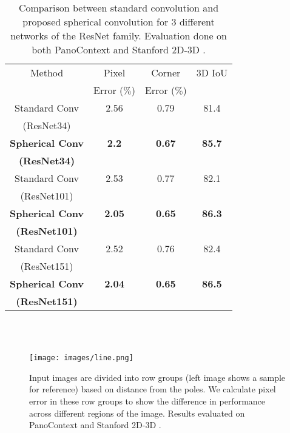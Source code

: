 \documentclass[final]{cvpr}
\begin{document}
\begin{table}[htb!]
\centering
 \begin{tabular}{||c c c c||} 
 \hline
 Method & Pixel & Corner & 3D IoU \\[0.5ex] 
 &Error ($\%$)&Error ($\%$)&\\[0.5ex]
 \hline\hline
 Standard Conv & 2.56 & 0.79 & 81.4 \\ [0.5ex] 
  \footnotesize (ResNet34) & &  & \\ \hline
 \textbf{Spherical Conv} & \textbf{2.2} & \textbf{0.67} &  \textbf{85.7}\\ [0.5ex] 
   \footnotesize \textbf{(ResNet34)} & &  & \\ \hline
 \hline
  Standard Conv & 2.53 & 0.77 & 82.1  \\ [0.5ex]
    \footnotesize (ResNet101) & &  & \\ \hline
 \textbf{Spherical Conv }& \textbf{2.05} & \textbf{0.65 }& \textbf{86.3} \\ [0.5ex]
   \footnotesize \textbf{(ResNet101) }& &  & \\ \hline
 \hline
  Standard Conv & 2.52 & 0.76 & 82.4 \\ [0.5ex]
    \footnotesize (ResNet151) & &  & \\ \hline
 \textbf{Spherical Conv} & \textbf{2.04} & \textbf{0.65} & \textbf{86.5} \\ [0.5ex]
   \footnotesize \textbf{(ResNet151)} & &  & \\ \hline

 \hline
\end{tabular} \\~\\
\caption{Comparison between standard convolution and proposed spherical convolution for 3 different networks of the ResNet family. Evaluation done on both PanoContext \cite{zhang2014panocontext} and Stanford 2D-3D \cite{armeni2017joint}.}
\label{tab:Table7}
\end{table}
\begin{figure}
    \centering
    \texttt{[image: images/line.png]}
    \caption{Input images are divided into row groups (left image shows a sample for reference) based on distance from the poles. We calculate pixel error in these row groups to show the difference in performance across different regions of the image. Results evaluated on PanoContext \cite{zhang2014panocontext} and Stanford 2D-3D  \cite{armeni2017joint}.}
    \label{fig:line_chart}
\end{figure}
\end{document}
